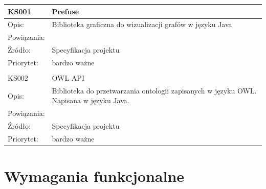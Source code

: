 \documentclass[a4paper,10pt]{article}
\begin{document}
\begin{center}
\begin{tabular}{|m{3cm}|m{9cm}|} \hline

KS001 & Prefuse \\ \hline
Opis: &  Biblioteka graficzna do wizualizacji grafów w języku Java\\ \hline
Powiązania: &  \\ \hline
Źródło: & Specyfikacja projektu \\ \hline
Priorytet: & bardzo ważne \\ \hline

\multicolumn{2}{c}{} \\
 \hline

KS002 & OWL API \\ \hline
Opis: &  Biblioteka do przetwarzania ontologii zapisanych w języku OWL. Napisana w języku Java.\\ \hline
Powiązania: &  \\ \hline
Źródło: & Specyfikacja projektu \\ \hline
Priorytet: & bardzo ważne \\ \hline


\end{tabular}
\end{center}

\section{Wymagania funkcjonalne}

\end{document}
